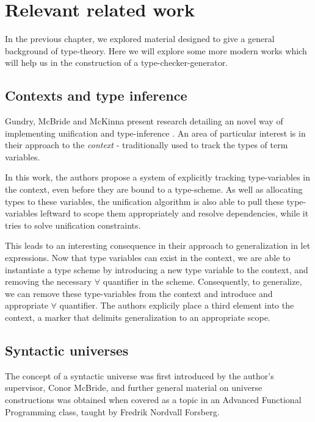 \chapter{Relevant related work}

In the previous chapter, we explored material designed to give a
general background of type-theory. Here we will explore some more
modern works which will help us in the construction of a
type-checker-generator.

\section{Contexts and type inference}

Gundry, McBride and McKinna present research detailing an
novel way of implementing unification and
type-inference \cite{TypeInferenceInContext}. An area of
particular interest is in their approach to the
\emph{context} - traditionally used to track the types of
term variables.

In this work, the authors propose a system of explicitly
tracking type-variables in the context, even before they are
bound to a type-scheme. As well as allocating types
to these variables, the unification algorithm is also
able to pull these type-variables leftward to scope them
appropriately and resolve dependencies, while it tries to
solve unification constraints.

This leads to an interesting consequence in their approach to
generalization in let expressions. Now that type variables
can exist in the context, we are able to instantiate a type
scheme by introducing a new type variable to the context,
and removing the necessary $\forall$ quantifier in the
scheme. Consequently, to generalize, we can remove these
type-variables from the context and introduce and
appropriate $\forall$ quantifier. The authors explicily
place a third element into the context, a marker that delimits
generalization to an appropriate scope.

\section{Syntactic universes}

The concept of a syntactic universe was first introduced by
the author's supervisor, Conor McBride, and further general
material on universe constructions was obtained when covered
as a topic in an Advanced Functional Programming class, taught
by Fredrik Nordvall Forsberg.

